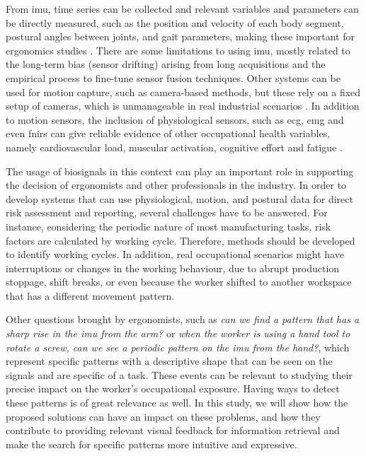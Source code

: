 From \gls{imu}, time series can be collected and relevant variables and parameters can be directly measured, such as the position and velocity of each body segment, postural angles between joints, and gait parameters, making these important for ergonomics studies \cite{Caputo2019, Hang19}. There are some limitations to using \gls{imu}, mostly related to the long-term bias (sensor drifting) arising from long acquisitions and the empirical process to fine-tune sensor fusion techniques. Other systems can be used for motion capture, such as camera-based methods, but these rely on a fixed setup of cameras, which is unmanageable in real industrial scenarios \cite{sara}. In addition to motion sensors, the inclusion of physiological sensors, such as \gls{ecg}, \gls{emg} and even \gls{fnirs} can give reliable evidence of other occupational health variables, namely cardiovascular load, muscular activation, cognitive effort and fatigue \cite{silva_rip, cardiovascular_load, rythm_cyclic_work, rui_varandas}.

The usage of biosignals in this context can play an important role in supporting the decision of ergonomists and other professionals in the industry. In order to develop systems that can use physiological, motion, and postural data for direct risk assessment and reporting, several challenges have to be answered. For instance, considering the periodic nature of most manufacturing tasks, risk factors are calculated by working cycle. Therefore, methods should be developed to identify working cycles. In addition, real occupational scenarios might have interruptions or changes in the working behaviour, due to abrupt production stoppage, shift breaks, or even because the worker shifted to another workspace that has a different movement pattern. 

Other questions brought by ergonomists, such as \textit{can we find a pattern that has a sharp rise in the \gls{imu} from the arm?} or \textit{when the worker is using a hand tool to rotate a screw, can we see a periodic pattern on the \gls{imu} from the hand?}, which represent specific patterns with a descriptive shape that can be seen on the signals and are specific of a task. These events can be relevant to studying their precise impact on the worker's occupational exposure. Having ways to detect these patterns is of great relevance as well. In this study, we will show how the proposed solutions can have an impact on these problems, and how they contribute to providing relevant visual feedback for information retrieval and make the search for specific patterns more intuitive and expressive.

